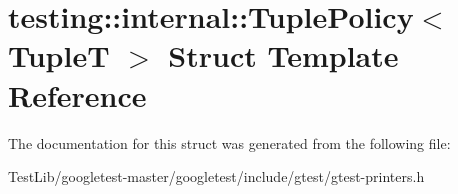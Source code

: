 \hypertarget{structtesting_1_1internal_1_1TuplePolicy}{}\section{testing\+:\+:internal\+:\+:Tuple\+Policy$<$ TupleT $>$ Struct Template Reference}
\label{structtesting_1_1internal_1_1TuplePolicy}


The documentation for this struct was generated from the following file\+:\begin{DoxyCompactItemize}
\item 
Test\+Lib/googletest-\/master/googletest/include/gtest/gtest-\/printers.\+h\end{DoxyCompactItemize}

